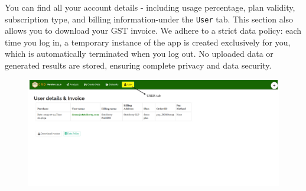 \documentclass[
  letterpaper,
  DIV=11,
  numbers=noendperiod]{scrartcl}
\begin{document}
You can find all your account details - including usage percentage, plan
validity, subscription type, and billing information-under the
\texttt{User} tab. This section also allows you to download your GST
invoice. We adhere to a strict data policy: each time you log in, a
temporary instance of the app is created exclusively for you, which is
automatically terminated when you log out. No uploaded data or generated
results are stored, ensuring complete privacy and data security.

\begin{figure}

{\centering \includegraphics{user_2.webp}

}

\end{figure}
\end{document}

